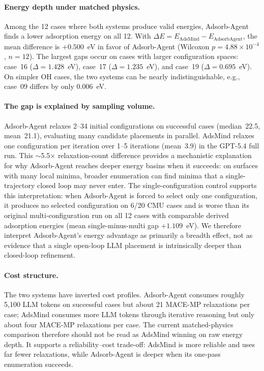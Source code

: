 \paragraph{Energy depth under matched physics.}
Among the 12 cases where both systems produce valid energies, Adsorb-Agent finds a lower adsorption energy on all 12.
With $\Delta E = E_{\mathrm{AdsMind}} - E_{\mathrm{AdsorbAgent}}$, the mean difference is $+0.500$~eV in favor of Adsorb-Agent (Wilcoxon $p = 4.88 \times 10^{-4}$, $n = 12$).
The largest gaps occur on cases with larger configuration spaces: case~16 ($\Delta = 1.428$~eV), case~17 ($\Delta = 1.235$~eV), and case~19 ($\Delta = 0.695$~eV).
On simpler OH cases, the two systems can be nearly indistinguishable, e.g., case~09 differs by only 0.006~eV.

\paragraph{The gap is explained by sampling volume.}
Adsorb-Agent relaxes 2--34 initial configurations on successful cases (median~22.5, mean~21.1), evaluating many candidate placements in parallel.
AdsMind relaxes one configuration per iteration over 1--5 iterations (mean~3.9) in the GPT-5.4 full run.
This $\sim$5.5$\times$ relaxation-count difference provides a mechanistic explanation for why Adsorb-Agent reaches deeper energy basins when it succeeds: on surfaces with many local minima, broader enumeration can find minima that a single-trajectory closed loop may never enter.
The single-configuration control supports this interpretation: when Adsorb-Agent is forced to select only one configuration, it produces no selected configuration on 6/20 CMU cases and is worse than its original multi-configuration run on all 12 cases with comparable derived adsorption energies (mean single-minus-multi gap $+1.109$~eV).
We therefore interpret Adsorb-Agent's energy advantage as primarily a breadth effect, not as evidence that a single open-loop LLM placement is intrinsically deeper than closed-loop refinement.

\paragraph{Cost structure.}
The two systems have inverted cost profiles.
Adsorb-Agent consumes roughly 5{,}100 LLM tokens on successful cases but about 21 MACE-MP relaxations per case; AdsMind consumes more LLM tokens through iterative reasoning but only about four MACE-MP relaxations per case.
The current matched-physics comparison therefore should not be read as AdsMind winning on raw energy depth.
It supports a reliability--cost trade-off: AdsMind is more reliable and uses far fewer relaxations, while Adsorb-Agent is deeper when its one-pass enumeration succeeds.

